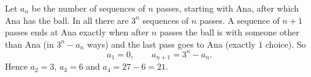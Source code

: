 Let $a_n$ be the number of sequences of $n$ passes, starting with Ana, after which Ana has the ball. In all there are $3^{n}$ sequences of $n$ passes. A sequence of $n+1$ passes ends at Ana exactly when after $n$ passes the ball is with someone other than Ana (in $3^n-a_n$ ways) and the last pass goes to Ana (exactly $1$ choice). So
\[
a_1=0,\qquad a_{n+1}=3^n-a_n .
\]
Hence $a_2=3$, $a_3=6$ and $a_4=27-6=\boxed{21}$.
